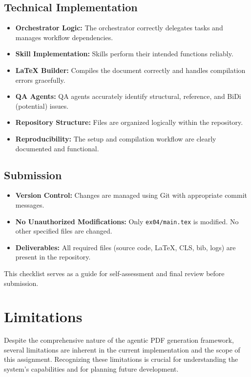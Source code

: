 \documentclass{custom-academic-template}
\begin{document}
\subsection{Technical Implementation}
\begin{itemize}
    \item [ ] 	\textbf{Orchestrator Logic:} The orchestrator correctly delegates tasks and manages workflow dependencies.
    \item [ ] 	\textbf{Skill Implementation:} Skills perform their intended functions reliably.
    \item [ ] 	\textbf{LaTeX Builder:} Compiles the document correctly and handles compilation errors gracefully.
    \item [ ] 	\textbf{QA Agents:} QA agents accurately identify structural, reference, and BiDi (potential) issues.
    \item [ ] 	\textbf{Repository Structure:} Files are organized logically within the repository.
    \item [ ] 	\textbf{Reproducibility:} The setup and compilation workflow are clearly documented and functional.
\end{itemize}

\subsection{Submission}
\begin{itemize}
    \item [ ] 	\textbf{Version Control:} Changes are managed using Git with appropriate commit messages.
    \item [ ] 	\textbf{No Unauthorized Modifications:} Only 	\texttt{ex04/main.tex} is modified. No other specified files are changed.
    \item [ ] 	\textbf{Deliverables:} All required files (source code, LaTeX, CLS, bib, logs) are present in the repository.
\end{itemize}
This checklist serves as a guide for self-assessment and final review before submission.

\section{Limitations}
Despite the comprehensive nature of the agentic PDF generation framework, several limitations are inherent in the current implementation and the scope of this assignment. Recognizing these limitations is crucial for understanding the system's capabilities and for planning future development.
\end{document}
